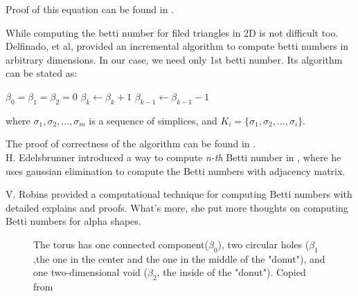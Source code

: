 \documentclass[11pt]{article}
\begin{document}
\indent Proof of this equation can be found in \cite{cyclomatic}.

\indent While computing the betti number for filed triangles in 2D is not difficult too. Delfinado, et al, \cite{incre_betti} provided an incremental algorithm to compute betti numbers in arbitrary dimensions. In our case, we need only 1st betti number. Its algorithm can be stated as:

\begin{algorithmic}[1]
		\State $\beta_0 = \beta_1 = \beta_2 = 0$
				\State $\beta_k \gets \beta_k + 1$
			\Else
				\State $\beta_{k-1} \gets \beta_{k-1} -1$
			\EndIf
		\EndFor
	\EndFunction 
\end{algorithmic}

where $\sigma_1, \sigma_2, ..., \sigma_m$ is a sequence of simplices, and $K_i = \{ \sigma_1, \sigma_2, ..., \sigma_i \}$.

\indent The proof of correctness of the algorithm can be found in \cite{incre_betti}. \\

\indent H. Edelsbrunner introduced a way to compute \emph{n-th} Betti number in \cite{Edel Book}, where he uses gaussian elimination to compute the Betti numbers with adjacency matrix.

\indent V. Robins \cite{alpha betti} provided a computational technique for computing Betti numbers with detailed explains and proofs. What's more, she put more thoughts on computing Betti numbers for alpha shapes.

\begin{figure}
	\caption{\label{fig:Torus} The torus has one connected component($\beta_0$), two circular holes ($\beta_1$,the one in the center and the one in the middle of the "donut"), and one two-dimensional void ($\beta_2$, the inside of the "donut"). Copied from \cite{betti wiki}}
\end{figure}
\end{document}
